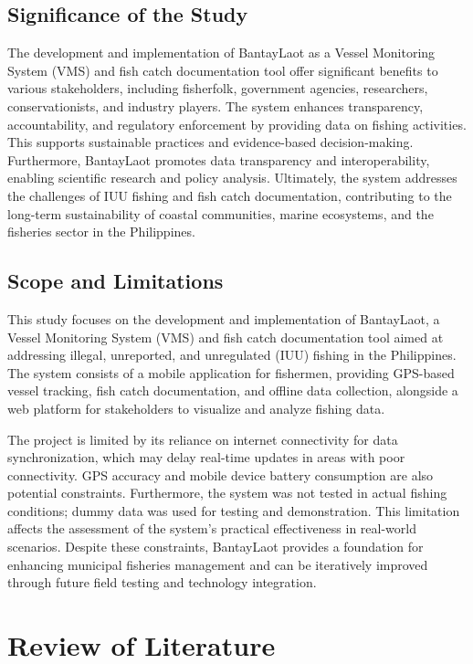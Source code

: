 \documentclass[journal]{IEEEtran}
\begin{document}
\subsection{Significance of the Study}
The development and implementation of BantayLaot as a Vessel Monitoring System (VMS) and fish catch documentation tool offer significant benefits to various stakeholders, including fisherfolk, government agencies, researchers, conservationists, and industry players. The system enhances transparency, accountability, and regulatory enforcement by providing data on fishing activities. This supports sustainable practices and evidence-based decision-making. Furthermore, BantayLaot promotes data transparency and interoperability, enabling scientific research and policy analysis. Ultimately, the system addresses the challenges of IUU fishing and fish catch documentation, contributing to the long-term sustainability of coastal communities, marine ecosystems, and the fisheries sector in the Philippines.


\subsection{Scope and Limitations}

This study focuses on the development and implementation of BantayLaot, a Vessel Monitoring System (VMS) and fish catch documentation tool aimed at addressing illegal, unreported, and unregulated (IUU) fishing in the Philippines. The system consists of a mobile application for fishermen, providing GPS-based vessel tracking, fish catch documentation, and offline data collection, alongside a web platform for stakeholders to visualize and analyze fishing data.

The project is limited by its reliance on internet connectivity for data synchronization, which may delay real-time updates in areas with poor connectivity. GPS accuracy and mobile device battery consumption are also potential constraints. Furthermore, the system was not tested in actual fishing conditions; dummy data was used for testing and demonstration. This limitation affects the assessment of the system’s practical effectiveness in real-world scenarios. Despite these constraints, BantayLaot provides a foundation for enhancing municipal fisheries management and can be iteratively improved through future field testing and technology integration.

\section{Review of Literature}
\end{document}
